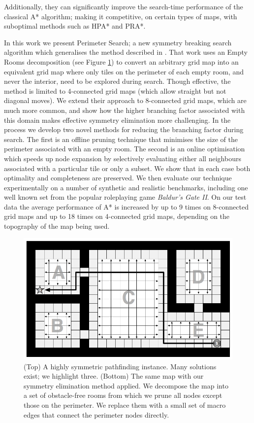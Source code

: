 Additionally, they can significantly improve the search-time performance of the classical A* algorithm; making it competitive,
on certain types of maps, with suboptimal methods such as HPA* and PRA*.
\par
In this work we present Perimeter Search; a new symmetry breaking search algorithm which generalises the method described in \cite{harabor10}.
That work uses an Empty Rooms decomposition (see Figure \ref{fig-overview}) to convert an arbitrary grid map into an
equivalent grid map where only tiles on the perimeter of each empty room, and never the interior, need to be explored during search. 
Though effective, the method is limited to 4-connected grid maps (which allow straight but not diagonal moves).
We extend their approach to 8-connected grid maps, which are much more common, and show how the higher branching factor associated 
with this domain makes effective symmetry elimination more challenging.
In the process we develop two novel methods for reducing the branching factor during search.
The first is an offline pruning technique that minimises the size of the perimeter associated with an empty room.
The second is an online optimisation which speeds up node expansion by selectively evaluating either all neighbours
associated with a particular tile or only a subset.
We show that in each case both optimality and completeness are preserved.
We then evaluate our technique experimentally on a number of synthetic and realistic benchmarks, including one well known set 
from the popular roleplaying game \emph{Baldur's Gate II}.
On our test data the average performance of A* is increased by up to 9 times on 8-connected grid maps and up to
18 times on 4-connected grid maps, depending on the topography of the map being used.

\begin{figure}[tb]
       \begin{center}
                       \includegraphics[scale=0.30, trim = 10mm 10mm 10mm 0mm]{diagrams/overview.png}
       \end{center}
	\vspace{-3pt}
       \caption{(Top) A highly symmetric pathfinding instance. Many solutions exist; we highlight three. 
				(Bottom) The same map with our symmetry elimination method applied. We decompose the map
				into a set of obstacle-free rooms from which we prune all nodes except those on the perimeter.
				We replace them with a small set of macro edges that connect the perimeter nodes directly.} 
       \label{fig-overview}
\end{figure}
